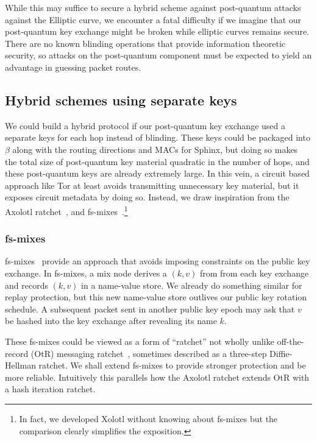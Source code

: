 \documentclass[twoside,letterpaper]{llncs}
\begin{document}
While this may suffice to secure a hybrid scheme against post-quantum
attacks against the Elliptic curve, we encounter a fatal difficulty
if we imagine that our post-quantum key 
exchange might be broken while elliptic curves remains secure.  
There are no known blinding operations that provide information
theoretic security, so attacks on the post-quantum component must be
expected to yield an advantage in guessing packet routes.


\subsection{Hybrid schemes using separate keys}

We could build a hybrid protocol if our post-quantum key exchange
used a separate keys for each hop instead of blinding.  These keys
could be packaged into $\beta$ along with the routing directions and
MACs for Sphinx, but doing so makes the total size of post-quantum 
key material quadratic in the number of hops, and these post-quantum
keys are already extremely large.
In this vein, a circuit based approach like Tor at least avoids
transmitting unnecessary key material, but it exposes circuit
metadata by doing so. 
Instead, we draw inspiration from the Axolotl
ratchet~\cite{TextSecure}, and fs-mixes~\cite{fs-mix}.\footnote{In
  fact, we developed Xolotl without knowing about fs-mixes but the
  comparison clearly simplifies the exposition.}

\subsubsection{fs-mixes}

fs-mixes~\cite{fs-mix} provide an approach that
avoids imposing constraints on the public key exchange.  In fs-mixes,
a mix node derives a $(k,v)$ from from each key exchange and records
$(k,v)$ in a name-value store.  We already do something similar for 
replay protection, but this new name-value store outlives our public
key rotation schedule.  A subsequent packet sent in another public
key epoch may ask that $v$ be hashed into the key exchange after
revealing its name $k$.  

These fs-mixes could be viewed as a form of ``ratchet'' not wholly
unlike off-the-record (OtR) messaging ratchet~\cite{OtR},
sometimes described as a three-step Diffie-Hellman ratchet.  
We shall extend fs-mixes to provide stronger protection and be more
reliable.  Intuitively this parallels how the Axolotl 
ratchet extends OtR with a hash iteration ratchet.
\end{document}
